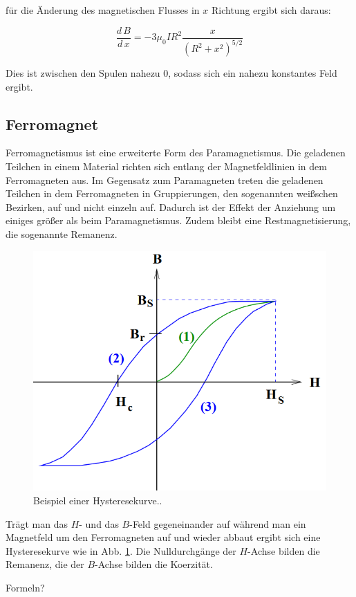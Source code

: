 für die Änderung des magnetischen Flusses in $x$ Richtung ergibt sich daraus:

\begin{equation}
  \frac{d\,B}{d\,x}=-3\mu_0IR^2\frac{x}{\left(R^2+x^2\right)^{5/2}}
  \label{eqn:hh}
\end{equation}

Dies ist zwischen den Spulen nahezu 0, sodass sich ein nahezu konstantes Feld ergibt.

\subsection{Ferromagnet}

Ferromagnetismus ist eine erweiterte Form des Paramagnetismus.
Die geladenen Teilchen in einem Material richten sich entlang der Magnetfeldlinien
in dem Ferromagneten aus. Im Gegensatz zum Paramagneten treten die geladenen
Teilchen in dem Ferromagneten in Gruppierungen, den sogenannten weißschen Bezirken, auf und nicht einzeln auf.
Dadurch ist der Effekt der Anziehung um einiges größer als beim
Paramagnetismus. Zudem bleibt eine Restmagnetisierung, die sogenannte Remanenz.
\begin{figure}
  \centering
  \includegraphics{content/images/Hysterese.png}
  \caption{Beispiel einer Hysteresekurve.\cite{anleitung}.}
  \label{fig:hr}
\end{figure}
Trägt man das $H$- und das $B$-Feld gegeneinander auf während
man ein Magnetfeld um den Ferromagneten auf und wieder abbaut
ergibt sich eine Hysteresekurve wie in Abb. \ref{fig:hr}. Die Nulldurchgänge
der $H$-Achse bilden die Remanenz, die der $B$-Achse bilden die Koerzität.

Formeln?
